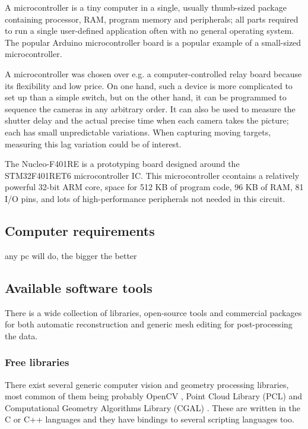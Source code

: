 A microcontroller is a tiny computer in a single, usually thumb-sized package containing processor, RAM, program memory and peripherals; all parts required to run a single user-defined application often with no general operating system.
The popular Arduino microcontroller board is a popular example of a small-sized microcontroller.

A microcontroller was chosen over e.g. a computer-controlled relay board because its flexibility and low price.
On one hand, such a device is more complicated to set up than a simple switch, but on the other hand, it can be programmed to sequence the cameras in any arbitrary order.
It can also be used to measure the shutter delay and the actual precise time when each camera takes the picture; each has small unpredictable variations.
When capturing moving targets, measuring this lag variation could be of interest.

The Nucleo-F401RE is a prototyping board designed around the STM32F401RET6 microcontroller IC.
This microcontroller ccontains a relatively powerful 32-bit ARM core, space for 512 KB of program code, 96 KB of RAM, 81 I/O pins, and lots of high-performance peripherals not needed in this circuit.


\subsection{Computer requirements} %

any pc will do, the bigger the better


\subsection{Available software tools}

 There is a wide collection of libraries, open-source tools and commercial packages for both automatic reconstruction and generic mesh editing for post-processing the data.

\subsubsection{Free libraries} %

There exist several generic computer vision and geometry processing libraries, most common of them being probably OpenCV \cite{opencv}, Point Cloud Library (PCL) \cite{pcl} and Computational Geometry Algorithms Library (CGAL) \cite{cgal}. These are written in the C or C++ languages and they have bindings to several scripting languages too.

